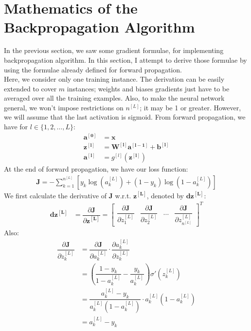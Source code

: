 \documentclass[a4paper, 12pt]{report}
\begin{document}
\section{Mathematics of the Backpropagation Algorithm}
In the previous section, we saw some gradient formulae, for implementing backpropagation algorithm. In this section, I attempt to derive those formulae by using the formulae already defined for forward propagation. \\
\break
Here, we consider only one training instance. The derivation can be easily extended to cover $m$ instances; weights and biases gradients just have to be averaged over all the training examples. Also, to make the neural network general, we won't impose restrictions on $n^{[L]}$; it may be 1 or greater. However, we will assume that the last activation is sigmoid. From forward propagation, we have for $l \in \{1, 2, \dots, L\}$:
\begin{align*}
\bm{a^{\left[0\right]}} &= \bm{x} \\
\bm{z^{\left[l\right]}} &= \bm{W^{\left[l\right]}}\bm{a^{\left[l-1\right]}} + \bm{b^{\left[l\right]}} \\
\bm{a^{\left[l\right]}} &= g^{[l]}\left(\bm{z^{\left[l\right]}}\right)
\end{align*}
At the end of forward propagation, we have our loss function:
\begin{align*}
\bm{J} = -\sum_{k=1}^{n^{[L]}}\left[y_{k}\log\left(a_{k}^{[L]}\right) + \left(1-y_{k}\right)\log\left(1-a_{k}^{[L]}\right)\right]
\end{align*}
We first calculate the derivative of $\bm{J}$ w.r.t. $\bm{z^{\left[L\right]}}$, denoted by $\bm{dz^{\left[L\right]}}$:
\begin{align*}
\bm{dz^{\left[L\right]}} &= \dfrac{\partial \bm{J}}{\partial \bm{z^{\left[L\right]}}} = 
\begin{bmatrix}
\dfrac{\partial \bm{J}}{\partial z_{1}^{\left[L\right]}} &
\dfrac{\partial \bm{J}}{\partial z_{2}^{\left[L\right]}} &
\dots &
\dfrac{\partial \bm{J}}{\partial z_{n^{[L]}}^{\left[L\right]}}
\end{bmatrix}^T
\end{align*}
Also:
\begin{align*}
\dfrac{\partial \bm{J}}{\partial z_k^{\left[L\right]}} &= \dfrac{\partial \bm{J}}{\partial a_{k}^{\left[L\right]}}\cdot\dfrac{\partial a_{k}^{\left[L\right]}}{\partial z_{k}^{\left[L\right]}} \\
&= \left(\dfrac{1-y_{k}}{1-a_{k}^{[L]}} - \dfrac{y_{k}}{a_{k}^{[L]}}\right)\sigma'\left(z_{k}^{\left[L\right]}\right) \\
&= \dfrac{a_k^{[L]} - y_k}{a_k^{[L]}\left(1-a_k^{[L]}\right)}\cdot a_k^{[L]}\left(1-a_k^{[L]}\right) \\
&= a_k^{[L]} - y_k
\end{align*}
\end{document}

